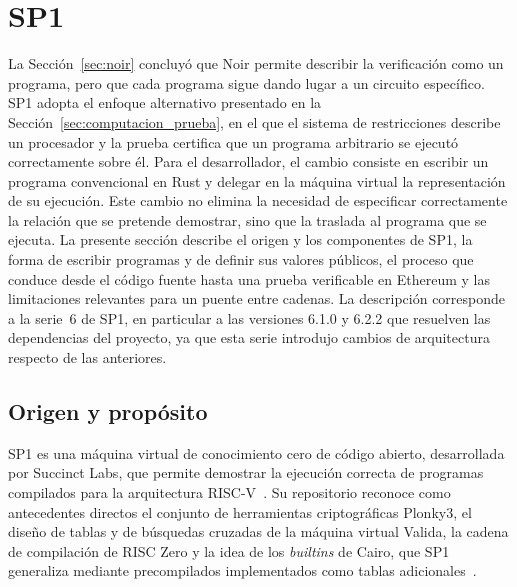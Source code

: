 \section{SP1}
\label{sec:sp1}

La Sección~\ref{sec:noir} concluyó que Noir permite describir la verificación como un programa,
pero que cada programa sigue dando lugar a un circuito específico. SP1 adopta el enfoque
alternativo presentado en la Sección~\ref{sec:computacion_prueba}, en el que el sistema de
restricciones describe un procesador y la prueba certifica que un programa arbitrario se ejecutó
correctamente sobre él. Para el desarrollador, el cambio consiste en escribir un programa
convencional en Rust y delegar en la máquina virtual la representación de su ejecución. Este
cambio no elimina la necesidad de especificar correctamente la relación que se pretende
demostrar, sino que la traslada al programa que se ejecuta. La presente sección describe el origen
y los componentes de SP1, la forma de escribir programas y de definir sus valores públicos, el
proceso que conduce desde el código fuente hasta una prueba verificable en Ethereum y las
limitaciones relevantes para un puente entre cadenas. La descripción corresponde a la serie~6 de
SP1, en particular a las versiones 6.1.0 y 6.2.2 que resuelven las dependencias del proyecto, ya
que esta serie introdujo cambios de arquitectura respecto de las anteriores.

\subsection{Origen y propósito}
\label{sec:sp1_origen}

SP1 es una máquina virtual de conocimiento cero de código abierto, desarrollada por Succinct
Labs, que permite demostrar la ejecución correcta de programas compilados para la arquitectura
RISC-V~\cite{sp1repo, sp1docsv6}. Su repositorio reconoce como antecedentes directos el conjunto
de herramientas criptográficas Plonky3, el diseño de tablas y de búsquedas cruzadas de la máquina
virtual Valida, la cadena de compilación de RISC Zero y la idea de los \textit{builtins} de Cairo,
que SP1 generaliza mediante precompilados implementados como tablas adicionales~\cite{sp1repo}.


